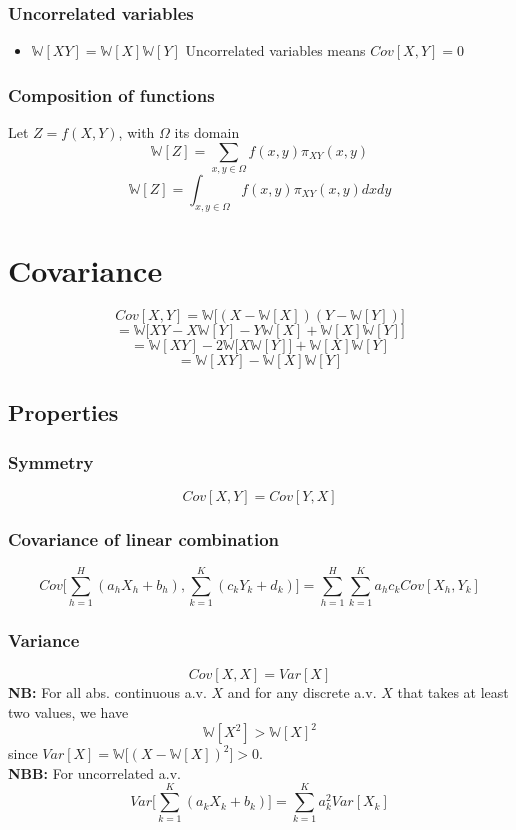 \documentclass[12pt]{article}
\begin{document}
\subsubsection{Uncorrelated variables}
\begin{itemize}
	\item $\mathbb{W}[XY]=\mathbb{W}[X]\mathbb{W}[Y]$
	\subitem Uncorrelated variables means $Cov[X,Y]=0$
\end{itemize}
\subsubsection{Composition of functions}
Let $Z=f(X,Y)$, with $\Omega$ its domain
$$\mathbb{W}[Z]=\sum_{x,y\in \Omega}f(x,y)\pi_{XY}(x,y)$$
$$\mathbb{W}[Z]=\int_{x,y\in \Omega}f(x,y)\pi_{XY}(x,y)dxdy$$

\clearpage
\section{Covariance}
$$Cov[X,Y]=\mathbb{W}\big[(X-\mathbb{W}[X])(Y-\mathbb{W}[Y])\big]$$
$$=\mathbb{W}\big[XY-X\mathbb{W}[Y]-Y\mathbb{W}[X]+\mathbb{W}[X]\mathbb{W}[Y]\big]$$
$$=\mathbb{W}[XY]-2\mathbb{W}\big[X\mathbb{W}[Y]\big]+\mathbb{W}[X]\mathbb{W}[Y]$$
$$=\mathbb{W}[XY]-\mathbb{W}[X]\mathbb{W}[Y]$$
\subsection{Properties}
\subsubsection{Symmetry}
$$Cov[X,Y]=Cov[Y,X]$$
\subsubsection{Covariance of linear combination}
$$Cov\bigg[\sum_{h=1}^{H}(a_hX_h+b_h),\sum_{k=1}^{K}(c_kY_k+d_k)\bigg]=\sum_{h=1}^{H}\sum_{k=1}^{K}a_hc_kCov[X_h,Y_k]$$
\subsubsection{Variance}
$$Cov[X,X]=Var[X]$$
\textbf{NB:} For all abs. continuous a.v. $X$ and for any discrete a.v. $X$ that takes at least two values, we have $$\mathbb{W}[X^2]>\mathbb{W}[X]^2$$ since $Var[X]=\mathbb{W}\big[(X-\mathbb{W}[X])^2\big]>0$.
\\\textbf{NBB:} For uncorrelated a.v. $$Var\bigg[\sum_{k=1}^{K}(a_kX_k+b_k)\bigg]=\sum_{k=1}^Ka_k^2Var[X_k]$$
\clearpage
\end{document}
